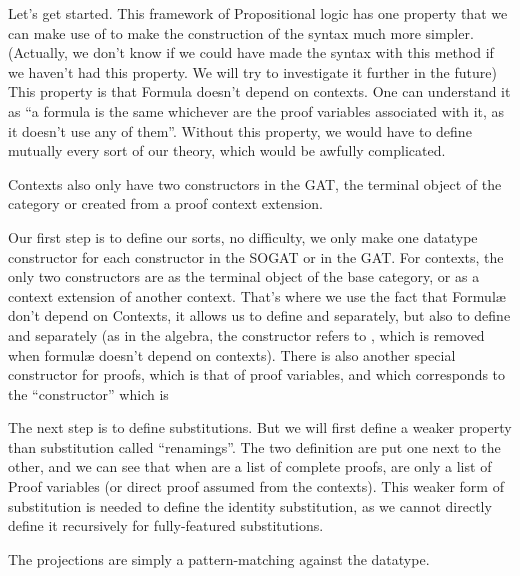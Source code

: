 \documentclass[10pt,a4paper]{article}
\begin{document}
			Let's get started. This framework of Propositional logic has one property that we can make use of to make the construction of the syntax much more simpler. (Actually, we don't know if we could have made the syntax with this method if we haven't had this property. We will try to investigate it further in the future) This property is that Formula doesn't depend on contexts. One can understand it as \enquote{a formula is the same whichever are the proof variables associated with it, as it doesn't use any of them}. Without this property, we would have to define mutually every sort of our theory, which would be awfully complicated.
			
			Contexts also only have two constructors in the GAT, the terminal object of the category or created from a proof context extension.
			
			Our first step is to define our sorts, no difficulty, we only make one datatype constructor for each constructor in the SOGAT or in the GAT. For contexts, the only two constructors are as the terminal object of the base category, or as a context extension of another context. That's where we use the fact that Formulæ don't depend on Contexts, it allows us to define  and  separately, but also to define  and  separately (as in the algebra, the  constructor refers to , which is removed when formulæ doesn't depend on contexts). There is also another special constructor for proofs, which is that of proof variables, and which corresponds to the \enquote{constructor} which is 
			
			\begin{tcolorbox}
				\agdasep
			\end{tcolorbox}
		
			The next step is to define substitutions. But we will first define a weaker property than substitution called \enquote{renamings}. The two definition are put one next to the other, and we can see that when  are a list of complete proofs,  are only a list of Proof variables (or direct proof assumed from the contexts). This weaker form of substitution is needed to define the identity substitution, as we cannot directly define it recursively for fully-featured substitutions.
			
			The projections are simply a pattern-matching against the datatype.
			
\end{document}
